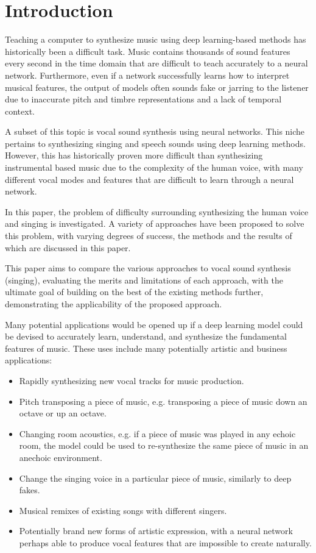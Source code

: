 \chapter{Introduction}

\noindent Teaching a computer to synthesize music using deep learning-based methods has historically been a difficult task. Music contains thousands of sound features every second in the time domain that are difficult to teach accurately to a neural network. Furthermore, even if a network successfully learns how to interpret musical features, the output of models often sounds fake or jarring to the listener due to inaccurate pitch and timbre representations and a lack of temporal context.

A subset of this topic is vocal sound synthesis using neural networks. This niche pertains to synthesizing singing and speech sounds using deep learning methods. However, this has historically proven more difficult than synthesizing instrumental based music due to the complexity of the human voice, with many different vocal modes and features that are difficult to learn through a neural network.

In this paper, the problem of difficulty surrounding synthesizing the human voice and singing is investigated. A variety of approaches have been proposed to solve this problem, with varying degrees of success, the methods and the results of which are discussed in this paper.

This paper aims to compare the various approaches to vocal sound synthesis (singing), evaluating the merits and limitations of each approach, with the ultimate goal of building on the best of the existing methods further, demonstrating the applicability of the proposed approach.

Many potential applications would be opened up if a deep learning model could be devised to accurately learn, understand, and synthesize the fundamental features of music. These uses include many potentially artistic and business applications:

\begin{itemize}
    \item Rapidly synthesizing new vocal tracks for music production.
    \item Pitch transposing a piece of music, e.g. transposing a piece of music down an octave or up an octave.
    \item Changing room acoustics, e.g. if a piece of music was played in any echoic room, the model could be used to re-synthesize the same piece of music in an anechoic environment.
    \item Change the singing voice in a particular piece of music, similarly to deep fakes.
    \item Musical remixes of existing songs with different singers.
    \item Potentially brand new forms of artistic expression, with a neural network perhaps able to produce vocal features that are impossible to create naturally.
\end{itemize}




